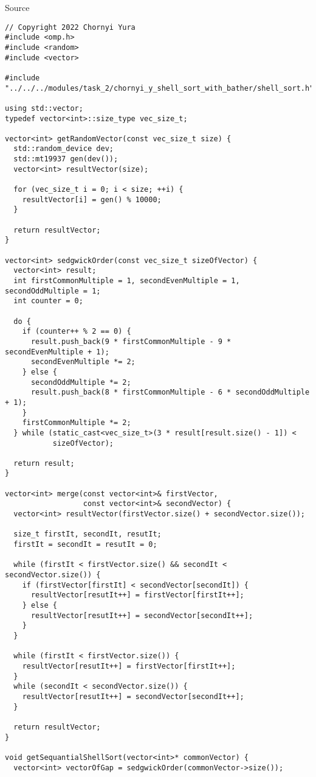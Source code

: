 \documentclass{report}
\begin{document}
\begin{center}
Source
\end{center}
\begin{lstlisting}
// Copyright 2022 Chornyi Yura
#include <omp.h>
#include <random>
#include <vector>

#include "../../../modules/task_2/chornyi_y_shell_sort_with_bather/shell_sort.h"

using std::vector;
typedef vector<int>::size_type vec_size_t;

vector<int> getRandomVector(const vec_size_t size) {
  std::random_device dev;
  std::mt19937 gen(dev());
  vector<int> resultVector(size);

  for (vec_size_t i = 0; i < size; ++i) {
    resultVector[i] = gen() % 10000;
  }

  return resultVector;
}

vector<int> sedgwickOrder(const vec_size_t sizeOfVector) {
  vector<int> result;
  int firstCommonMultiple = 1, secondEvenMultiple = 1, secondOddMultiple = 1;
  int counter = 0;

  do {
    if (counter++ % 2 == 0) {
      result.push_back(9 * firstCommonMultiple - 9 * secondEvenMultiple + 1);
      secondEvenMultiple *= 2;
    } else {
      secondOddMultiple *= 2;
      result.push_back(8 * firstCommonMultiple - 6 * secondOddMultiple + 1);
    }
    firstCommonMultiple *= 2;
  } while (static_cast<vec_size_t>(3 * result[result.size() - 1]) <
           sizeOfVector);

  return result;
}

vector<int> merge(const vector<int>& firstVector,
                  const vector<int>& secondVector) {
  vector<int> resultVector(firstVector.size() + secondVector.size());

  size_t firstIt, secondIt, resutIt;
  firstIt = secondIt = resutIt = 0;

  while (firstIt < firstVector.size() && secondIt < secondVector.size()) {
    if (firstVector[firstIt] < secondVector[secondIt]) {
      resultVector[resutIt++] = firstVector[firstIt++];
    } else {
      resultVector[resutIt++] = secondVector[secondIt++];
    }
  }

  while (firstIt < firstVector.size()) {
    resultVector[resutIt++] = firstVector[firstIt++];
  }
  while (secondIt < secondVector.size()) {
    resultVector[resutIt++] = secondVector[secondIt++];
  }

  return resultVector;
}

void getSequantialShellSort(vector<int>* commonVector) {
  vector<int> vectorOfGap = sedgwickOrder(commonVector->size());


\end{lstlisting}
\end{document}
